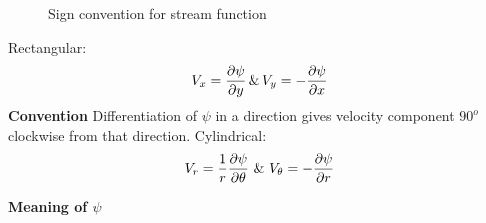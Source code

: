 \begin{figure}[h]
\begin{center}
\end{center}
\caption{Sign convention for stream function}
\label{psisignconvention}
\end{figure}


    Rectangular: 
    $$V_x = {\partial \psi \over \partial y} \, \& \, V_y = - {\partial \psi \over \partial x} $$
{\bf Convention}
Differentiation of $\psi$ in a direction gives velocity component $90^o$ clockwise from that direction.
    Cylindrical:
 $$ V_r = {1 \over r} {\partial \psi \over \partial \theta} \, \, \& \, \, V_\theta = - {\partial \psi \over \partial r} $$

{\bf Meaning of $\psi$}


